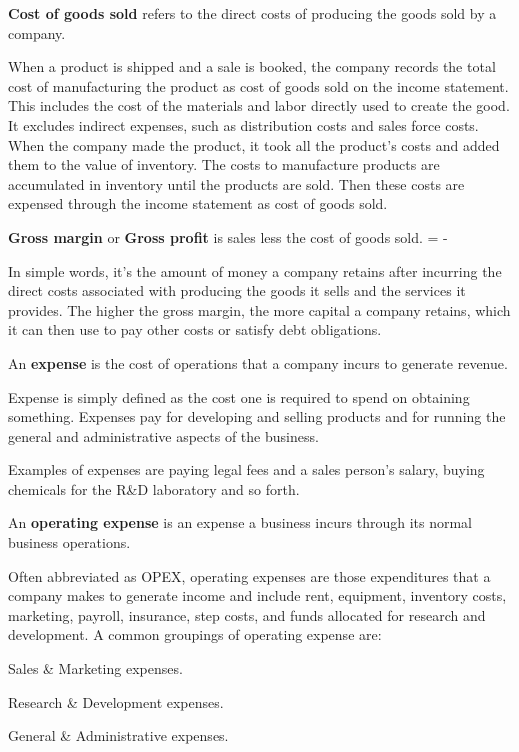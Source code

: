 \textbf{Cost of goods sold} refers to the direct costs of producing the goods sold by a company.
\ed

When a product is shipped and a sale is booked, the company records the total cost of manufacturing the product as
cost of goods sold on the income statement. This includes the cost of the materials and labor directly used to create
the good. It excludes indirect expenses, such as distribution costs and sales force costs. When the company made the
product, it took all the product's costs and added them to the value of inventory. The costs to manufacture products
are accumulated in inventory until the products are sold. Then these costs are expensed through the income statement
as cost of goods sold.

\textbf{Gross margin} or \textbf{Gross profit} is sales less the cost of goods sold.
\bse
{} =  - 
\ese
\ed

In simple words, it's the amount of money a company retains after incurring the direct costs associated with
producing the goods it sells and the services it provides. The higher the gross margin, the more capital a company
retains, which it can then use to pay other costs or satisfy debt obligations.

\bd[Expense]
An \textbf{expense} is the cost of operations that a company incurs to generate revenue.
\ed

Expense is simply defined as the cost one is required to spend on obtaining something. Expenses pay for developing
and selling products and for running the general and administrative aspects of the business.

\be
Examples of expenses are paying legal fees and a sales person's salary, buying chemicals for the R\&D laboratory and
so forth.
\ee

An \textbf{operating expense} is an expense a business incurs through its normal business operations.
\ed

Often abbreviated as OPEX, operating expenses are those expenditures that a company makes to generate income and include
rent, equipment, inventory costs, marketing, payroll, insurance, step costs, and funds allocated for research and
development. A common groupings of operating expense are:
\bit
\item Sales \& Marketing expenses.
\item Research \& Development expenses.
\item General \& Administrative expenses.
\eit


